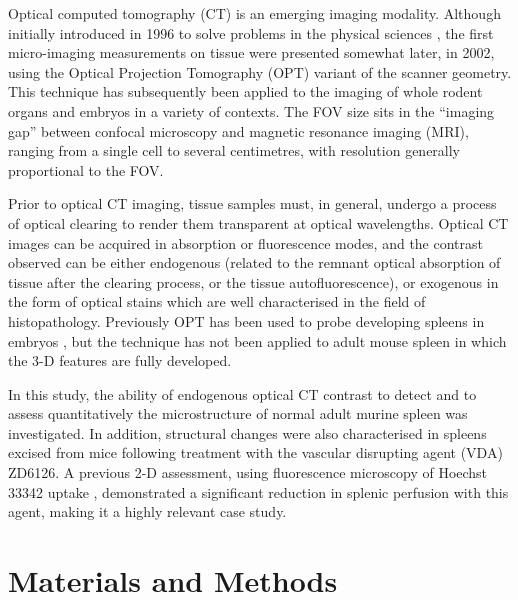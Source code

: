 	Optical computed tomography (CT) is an emerging imaging modality. Although initially introduced in 1996 to solve problems in the physical sciences \cite{goreradiation1996, winfreequantitative1996}, the first micro-imaging measurements on tissue were presented somewhat later, in 2002, using the Optical Projection Tomography (OPT) variant of the scanner geometry. \cite{sharpeoptical2002} This technique has subsequently been applied to the imaging of whole rodent organs and embryos in a variety of contexts. \cite{oldhamthree-dimensional2007, sharpeoptical2003}  The FOV size sits in the ``imaging gap'' between confocal microscopy and magnetic resonance imaging (MRI), ranging from a single cell to several centimetres, with resolution generally proportional to the FOV.
	
	Prior to optical CT imaging, tissue samples must, in general, undergo a process of optical clearing to render them transparent at optical wavelengths. \cite{oldhamoptical2008, zhurecent2013}  Optical CT images can be acquired in absorption or fluorescence modes, and the contrast observed can be either endogenous (related to the remnant optical absorption of tissue after the clearing process, or the tissue autofluorescence), or exogenous in the form of optical stains which are well characterised in the field of histopathology. Previously OPT has been used to probe developing spleens in embryos \cite{asayeshspleen2006, hecksher2004splanchnic}, but the technique has not been applied to adult mouse spleen in which the 3-D features are fully developed.
	
	In this study, the ability of endogenous optical CT contrast to detect and to assess quantitatively the microstructure of normal adult murine spleen was investigated. In addition, structural changes were also characterised in spleens excised from mice following treatment with the vascular disrupting agent (VDA) ZD6126. A previous 2-D assessment, using fluorescence microscopy of Hoechst 33342 uptake \cite{cullistumour2006}, demonstrated a significant reduction in splenic perfusion with this agent, making it a highly relevant case study.
	
	\section{Materials and Methods}
	
